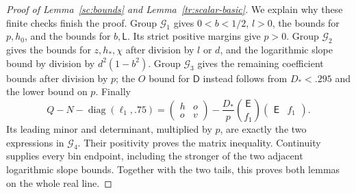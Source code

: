 \documentclass[11pt]{article}
\theoremstyle{definition}
\theoremstyle{remark}
\numberwithin{equation}{section}
\begin{document}
\begin{proof}[Proof of Lemma~\ref{sc:bounds} and Lemma~\ref{tr:scalar-basic}]
We explain why these finite checks finish the proof. Group $\mathcal G_1$
gives $0<b<1/2$, $l>0$, the bounds for $p,h_0$, and the bounds for
$b,\mathsf L$. Its strict positive margins give $p>0$.
Group $\mathcal G_2$ gives the bounds for $z,h_*,\chi$ after division by
$l$ or $d$, and the logarithmic slope bound by division by
$d^2(1-b^2)$. Group $\mathcal G_3$ gives the remaining coefficient bounds
after division by $p$; the $O$ bound for $\mathsf D$ instead follows from
$D_*<.295$ and the lower bound on $p$.
Finally
\[
 Q-N-\operatorname{diag}(\ell_1,.75)
 =\begin{pmatrix}h&o\\o&v\end{pmatrix}
     -\frac{D_*}{p}\binom{\mathsf E}{f_1}
                             \begin{pmatrix}\mathsf E&f_1\end{pmatrix}.
\]
Its leading minor and determinant, multiplied by $p$, are exactly the
two expressions in $\mathcal G_4$. Their positivity proves the matrix
inequality. Continuity supplies every bin endpoint, including the stronger
of the two adjacent logarithmic slope bounds. Together with the two tails,
this proves both lemmas on the whole real line.
\end{proof}



\end{document}
